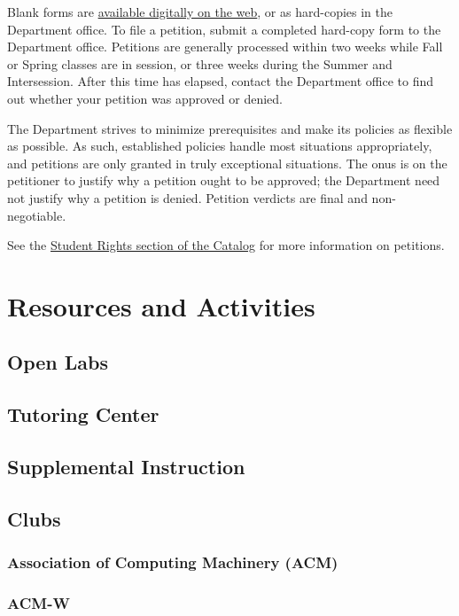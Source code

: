 \documentclass{book}
\begin{document}
Blank forms are \href{http://fullerton.edu/ecs/cs/resources/formsDocuments.asp}{available digitally on the web}, or as hard-copies in the Department office. To file a petition, submit a completed hard-copy form to the Department office. Petitions are generally processed within two weeks while Fall or Spring classes are in session, or three weeks during the Summer and Intersession. After this time has elapsed, contact the Department office to find out whether your petition was approved or denied.

The Department strives to minimize prerequisites and make its policies as flexible as possible. As such, established policies handle most situations appropriately, and petitions are only granted in truly exceptional situations. The onus is on the petitioner to justify why a petition ought to be approved; the Department need not justify why a petition is denied. Petition verdicts are final and non-negotiable.

See the \href{http://catalog.fullerton.edu/content.php?catoid=2&navoid=115#Student_Rights}{Student Rights section of the Catalog} for more information on petitions.

\chapter{Resources and Activities}

\section{Open Labs}

\section{Tutoring Center}

\section{Supplemental Instruction}

\section{Clubs}
\subsection{Association of Computing Machinery (ACM)}

\subsection{ACM-W}
\end{document}
